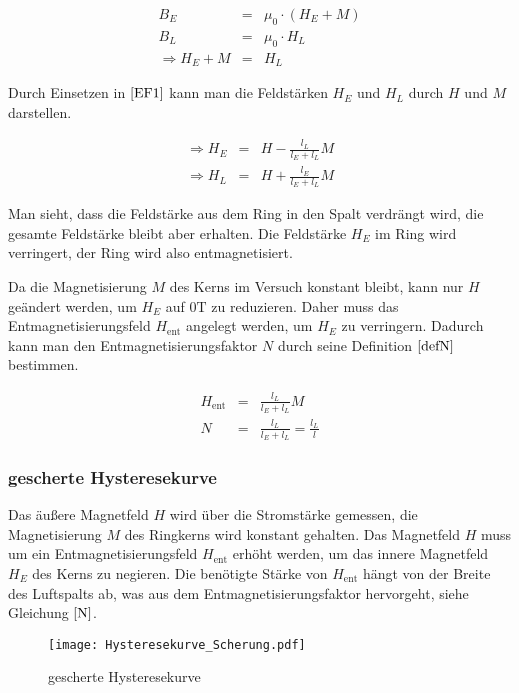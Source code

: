 \documentclass[12pt,a4paper]{scrartcl}
\numberwithin{equation}{section} %
\newcommand{\pu}[1]{\ensuremath{\mathrm{#1}}}
\renewcommand{\[}{} %
\renewcommand{\]}{\noindent} %
\begin{document}
\[
\begin{eqnarray}
    B_E &=& \mu_0 \cdot \left(H_E + M\right) \nonumber \\
    B_L &=& \mu_0 \cdot H_L \nonumber \\
    \Rightarrow H_E + M &=& H_L \label{EF3}
\end{eqnarray}
\]

Durch Einsetzen in \(\eqref{EF1}\) kann man die Feldstärken \(H_E\) und
\(H_L\) durch \(H\) und \(M\) darstellen.

\[
\begin{eqnarray}
    \Rightarrow H_E &=& H - \frac{l_L}{l_E+l_L} M \\
    \Rightarrow H_L &=& H + \frac{l_E}{l_E+l_L} M
\end{eqnarray}
\]

Man sieht, dass die Feldstärke aus dem Ring in den Spalt verdrängt wird,
die gesamte Feldstärke bleibt aber erhalten. Die Feldstärke \(H_E\) im
Ring wird verringert, der Ring wird also entmagnetisiert.

Da die Magnetisierung \(M\) des Kerns im Versuch konstant bleibt, kann
nur \(H\) geändert werden, um \(H_E\) auf \(\pu{0T}\) zu reduzieren.
Daher muss das Entmagnetisierungsfeld \(H_\mathrm{ent}\) angelegt
werden, um \(H_E\) zu verringern. Dadurch kann man den
Entmagnetisierungsfaktor \(N\) durch seine Definition \(\eqref{defN}\)
bestimmen.

\[
\begin{eqnarray}
    H_\mathrm{ent} &=& \frac{l_L}{l_E+l_L} M \\
    N &=& \frac{l_L}{l_E+l_L} = \frac{l_L}{l}
\end{eqnarray}
\]

\hypertarget{gescherte-hysteresekurve}{%
\subsubsection{gescherte
Hysteresekurve}\label{gescherte-hysteresekurve}}

Das äußere Magnetfeld \(H\) wird über die Stromstärke gemessen, die
Magnetisierung \(M\) des Ringkerns wird konstant gehalten. Das
Magnetfeld \(H\) muss um ein Entmagnetisierungsfeld \(H_\mathrm{ent}\)
erhöht werden, um das innere Magnetfeld \(H_E\) des Kerns zu negieren.
Die benötigte Stärke von \(H_\mathrm{ent}\) hängt von der Breite des
Luftspalts ab, was aus dem Entmagnetisierungsfaktor hervorgeht, siehe
Gleichung \(\eqref{N}\).

\begin{figure}
\centering
\texttt{[image: Hysteresekurve\_Scherung.pdf]}
\caption{gescherte Hysteresekurve}
\end{figure}
\end{document}
